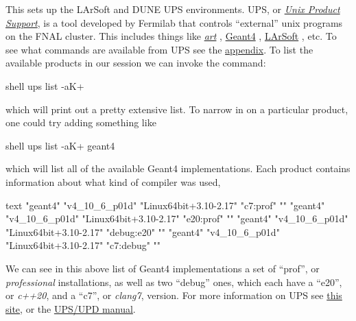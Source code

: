 \documentclass[8pt]{refart}
\begin{document}
This sets up the LArSoft and DUNE UPS environments.  UPS, or \href{https://mu2ewiki.fnal.gov/wiki/UPS}{\textit{Unix Product Support}}, is a tool developed by Fermilab that controls ``external'' unix programs on the FNAL cluster.  This includes things like \href{https://art.fnal.gov/}{\textit{art}} \cite{art}, \href{https://geant4.web.cern.ch/}{Geant4} \cite{geant4_1,geant4_2,geant4_3}, \href{https://larsoft.org/}{LArSoft} \cite{larsoft}, etc.  To see what commands are available from UPS see the \hyperref[appendixups]{appendix}.  To list the available products in our session we can invoke the command:
\begin{code}{shell}
ups list -aK+
\end{code}
which will print out a pretty extensive list.  To narrow in on a particular product, one could try adding something like
\begin{code}{shell}
ups list -aK+ geant4
\end{code}
which will list all of the available Geant4 implementations.  Each product contains information about what kind of compiler was used,
\begin{code}{text}
"geant4" "v4_10_6_p01d" "Linux64bit+3.10-2.17" "c7:prof" "" 
"geant4" "v4_10_6_p01d" "Linux64bit+3.10-2.17" "e20:prof" "" 
"geant4" "v4_10_6_p01d" "Linux64bit+3.10-2.17" "debug:e20" "" 
"geant4" "v4_10_6_p01d" "Linux64bit+3.10-2.17" "c7:debug" "" 
\end{code}
We can see in this above list of Geant4 implementations a set of ``prof'', or \textit{professional} installations, as well as two ``debug'' ones, which each have a ``e20'', or \textit{c++20}, and a ``c7'', or \textit{clang7}, version.  For more information on UPS see \href{https://mu2ewiki.fnal.gov/wiki/UPS}{this site}, or the \href{https://citeseerx.ist.psu.edu/viewdoc/download?doi=10.1.1.199.4454&rep=rep1&type=pdf}{UPS/UPD manual}.
\end{document}
